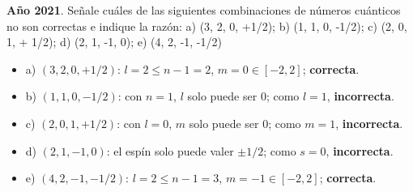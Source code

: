 \begin{exerciseEVAU}
    \textbf{Año 2021}.
    Señale cuáles de las siguientes combinaciones de números cuánticos no son correctas e indique la razón: a) (3, 2, 0, +1/2); b) (1, 1, 0, -1/2); c) (2, 0, 1, + 1/2); d) (2, 1, -1, 0); e) (4, 2, -1, -1/2)
    \begin{solu}
        \begin{itemize}
            \item a) \((3,2,0,+1/2)\): \(l=2\leq n-1=2\), \(m=0\in[-2,2]\); \textbf{correcta}.
            \item b) \((1,1,0,-1/2)\): con \(n=1\), \(l\) solo puede ser \(0\); como \(l=1\), \textbf{incorrecta}.
            \item c) \((2,0,1,+1/2)\): con \(l=0\), \(m\) solo puede ser \(0\); como \(m=1\), \textbf{incorrecta}.
            \item d) \((2,1,-1,0)\): el espín solo puede valer \(\pm 1/2\); como \(s=0\), \textbf{incorrecta}.
            \item e) \((4,2,-1,-1/2)\): \(l=2\leq n-1=3\), \(m=-1\in[-2,2]\); \textbf{correcta}.
        \end{itemize}
    \end{solu}
\end{exerciseEVAU}

